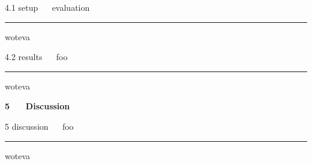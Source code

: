 \documentclass[11pt,compress,t,notes=noshow, xcolor=table]{beamer}
\newcommand{\highlight}[1]{\textcolor{highlightcol}{\textbf{#1}}}
\begin{document}

\LARGE
\begin{frame}{\textcolor{gray!90}{4.1 setup} ~~ evaluation}
\normalsize
\vspace{-0.5cm}
\noindent \textcolor{gray!90}{\rule{\textwidth}{1pt}}


\medskip

woteva

\end{frame}


\LARGE
\begin{frame}{\textcolor{gray!90}{4.2 results} ~~ foo}
\normalsize
\vspace{-0.5cm}
\noindent \textcolor{gray!90}{\rule{\textwidth}{1pt}}


\medskip

woteva

\end{frame}



\begin{frame}{}

\LARGE
\hspace{0pt}
\vfill
\textbf{\highlight{5 ~~ Discussion}}
\vfill
\hspace{0pt}

\end{frame}


\LARGE
\begin{frame}{\textcolor{gray!90}{5 discussion} ~~ foo}
\normalsize
\vspace{-0.5cm}
\noindent \textcolor{gray!90}{\rule{\textwidth}{1pt}}


\medskip

woteva

\end{frame}


\endlecture
\end{document}
